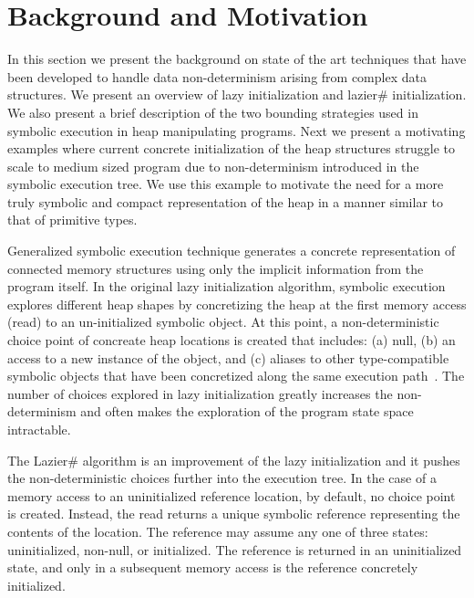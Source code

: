 \section{Background and Motivation}
\label{motivations}

In this section we present the background on state of the art
techniques that have been developed to handle data non-determinism
arising from complex data structures. We present an overview of lazy
initialization and lazier\# initialization. We also present a brief
description of the two bounding strategies used in symbolic execution
in heap manipulating programs. Next we present a motivating examples
where current concrete initialization of the heap structures struggle
to scale to medium sized program due to non-determinism introduced in
the symbolic execution tree. We use this example to motivate the need
for a more truly symbolic and compact representation of the heap in a
manner similar to that of primitive types.

Generalized symbolic execution technique generates a concrete
representation of connected memory structures using only the implicit
information from the program itself.  In the original lazy
initialization algorithm, symbolic execution explores different heap
shapes by concretizing the heap at the first memory access (read) to
an un-initialized symbolic object. At this point, a non-deterministic
choice point of concreate heap locations is created that includes: (a)
null, (b) an access to a new instance of the object, and (c) aliases
to other type-compatible symbolic objects that have been concretized
along the same execution path~\cite{GSE:TACAS2003}.  The number of
choices explored in lazy initialization greatly increases the
non-determinism and often makes the exploration of the program state
space intractable.

The Lazier\# algorithm is an improvement of the lazy initialization
and it pushes the non-deterministic choices further into the execution
tree. In the case of a memory access to an uninitialized reference
location, by default, no choice point is created. Instead, the read
returns a unique symbolic reference representing the contents of the
location. The reference may assume any one of three states:
uninitialized, non-null, or initialized. The reference is returned in
an uninitialized state, and only in a subsequent memory access is the
reference concretely initialized.

